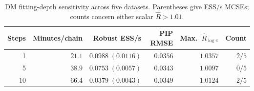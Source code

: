 \begin{table}[!t]
\centering
\caption{DM fitting-depth sensitivity across five datasets. Parentheses give ESS/s MCSEs; counts concern either scalar $\widehat R>1.01$.}
\label{tab:DM_implementation_sensitivity}
\fontsize{12}{9}\selectfont
\begin{tabular}{rrrrrr}
\toprule
Steps & Minutes/chain & Robust ESS/s & PIP RMSE & Max.\ $\widehat R_{\log\pi}$ & Count \\
\midrule
1 & $21.1$ & $0.0988\;(0.0116)$ & $0.0356$ & $1.0357$ & $2/5$ \\
5 & $38.9$ & $0.0753\;(0.0057)$ & $0.0343$ & $1.0097$ & $0/5$ \\
10 & $66.4$ & $0.0379\;(0.0043)$ & $0.0349$ & $1.0124$ & $2/5$ \\
\bottomrule
\end{tabular}
\end{table}
